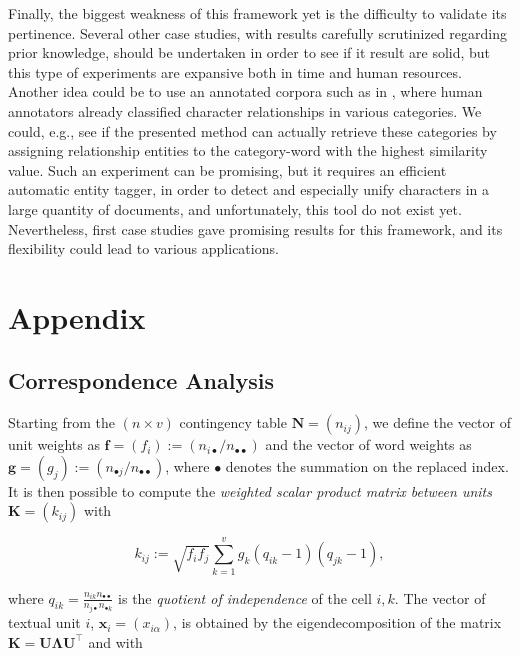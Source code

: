 \documentclass[
twocolumn,
]{ceurart}
\begin{document}
Finally, the biggest weakness of this framework yet is the difficulty to validate its pertinence. Several other case studies, with results carefully scrutinized regarding prior knowledge, should be undertaken in order to see if it result are solid, but this type of experiments are expansive both in time and human resources. Another idea could be to use an annotated corpora such as in \cite{Massey2015}, where human annotators already classified character relationships in various categories. We could, e.g., see if the presented method can actually retrieve these categories by assigning relationship entities to the category-word with the highest similarity value. Such an experiment can be promising, but it requires an efficient automatic entity tagger, in order to detect and especially unify characters in a large quantity of documents, and unfortunately, this tool do not exist yet. Nevertheless, first case studies gave promising results for this framework, and its flexibility could lead to various applications.

\appendix

\section{Appendix}

\subsection{Correspondence Analysis}
\label{ca_details}

Starting from the $(n \times v)$ contingency table $\mathbf{N} = (n_{ij})$, we define the vector of unit weights as $\mathbf{f} = (f_i) := (n_{i\bullet}/n_{\bullet \bullet})$ and the vector of word weights as $\mathbf{g} = (g_j) := (n_{\bullet j}/n_{\bullet \bullet})$, where $\bullet$ denotes the summation on the replaced index. It is then possible to compute the \emph{weighted scalar product matrix between units} $\mathbf{K} = (k_{ij})$ with

\begin{equation}
k_{ij} := \sqrt{f_i f_j} \sum_{k=1}^{v} g_k(q_{ik} - 1)(q_{jk} - 1), 
\end{equation}

where $q_{ik} = \frac{n_{ik} n_{\bullet \bullet}}{n_{j \bullet} n_{\bullet k}}$ is the \emph{quotient of independence} of the cell $i, k$. The vector of textual unit $i$, $\mathbf{x}_i = (x_{i\alpha})$, is obtained by the eigendecomposition of the matrix $\mathbf{K} = \mathbf{U}\bm{\Lambda}\mathbf{U}^\top$ and with
\end{document}
